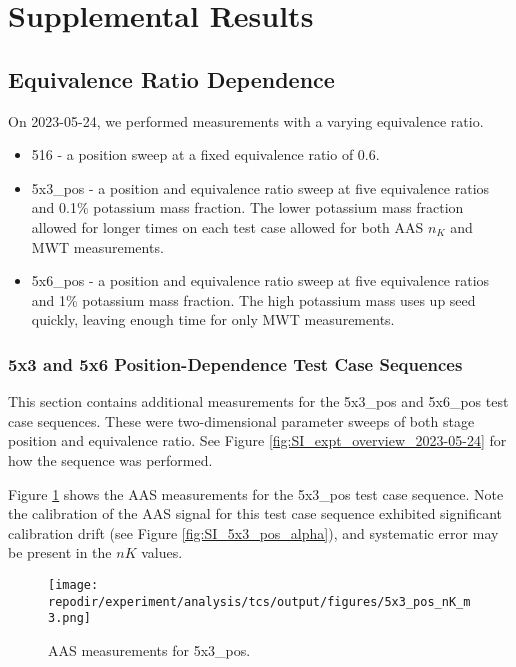 \section{Supplemental Results}

\subsection{Equivalence Ratio Dependence}

On 2023-05-24, we performed measurements with a varying equivalence ratio. 

\begin{itemize}
    \item 516 - a position sweep at a fixed equivalence ratio of 0.6.
    \item 5x3\_pos - a position and equivalence ratio sweep at five equivalence ratios and 0.1\% potassium mass fraction. The lower potassium mass fraction allowed for longer times on each test case allowed for both AAS $n_{K}$ and MWT measurements. 
    \item 5x6\_pos - a position and equivalence ratio sweep at five equivalence ratios and 1\% potassium mass fraction. The high potassium mass uses up seed quickly, leaving enough time for only MWT measurements. 
\end{itemize}
 
\subsubsection{5x3 and 5x6 Position-Dependence Test Case Sequences}

This section contains additional measurements for the 5x3\_pos and 5x6\_pos test case sequences. These were two-dimensional parameter sweeps of both stage position and equivalence ratio. See Figure \ref{fig:SI_expt_overview_2023-05-24} for how the sequence was performed. 

Figure \ref{fig:SI_5x3_pos_nK_m3} shows the AAS measurements for the 5x3\_pos test case sequence. Note the calibration of the AAS signal for this test case sequence exhibited significant calibration drift (see Figure \ref{fig:SI_5x3_pos_alpha}), and systematic error may be present in the $nK$ values. 


\begin{figure}[]
\centering
\texttt{[image: \\repodir/experiment/analysis/tcs/output/figures/5x3\_pos\_nK\_m3.png]}
\caption{AAS measurements for 5x3\_pos.}
\label{fig:SI_5x3_pos_nK_m3}
\end{figure}


